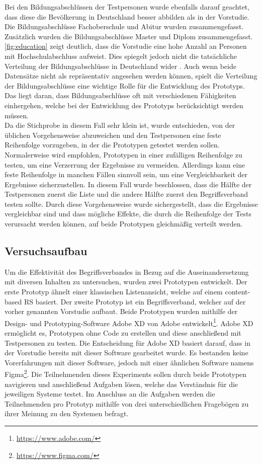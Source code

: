 Bei den Bildungsabschlüssen der Testpersonen wurde ebenfalls darauf geachtet, dass diese die Bevölkerung in Deutschland besser abbilden als in der Vorstudie.
Die Bildungsabschlüsse Fachoberschule und Abitur wurden zusammengefasst.
Zusätzlich wurden die Bildungsabschlüsse Master und Diplom zusammengefasst.
\autoref{fig:education} zeigt deutlich, dass die Vorstudie eine hohe Anzahl an Personen mit Hochschulabschluss aufweist.
Dies spiegelt jedoch nicht die tatsächliche Verteilung der Bildungsabschlüsse in Deutschland wider \cite{statistisches-bundesamt}.
Auch wenn beide Datensätze nicht als repräsentativ angesehen werden können, spielt die Verteilung der Bildungsabschlüsse eine wichtige Rolle für die Entwicklung des Prototyps.
Das liegt daran, dass Bildungsabschlüsse oft mit verschiedenen Fähigkeiten einhergehen, welche bei der Entwicklung des Prototyps berücksichtigt werden müssen.\\

Da die Stichprobe in diesem Fall sehr klein ist, wurde entschieden, von der üblichen Vorgehensweise abzuweichen und den Testpersonen eine feste Reihenfolge vorzugeben, in der die Prototypen getestet werden sollen.
Normalerweise wird empfohlen, Prototypen in einer zufälligen Reihenfolge zu testen, um eine Verzerrung der Ergebnisse zu vermeiden.
Allerdings kann eine feste Reihenfolge in manchen Fällen sinnvoll sein, um eine Vergleichbarkeit der Ergebnisse sicherzustellen.
In diesem Fall wurde beschlossen, dass die Hälfte der Testpersonen zuerst die Liste und die andere Hälfte zuerst den Begriffsverband testen sollte.
Durch diese Vorgehensweise wurde sichergestellt, dass die Ergebnisse vergleichbar sind und dass mögliche Effekte, die durch die Reihenfolge der Tests verursacht werden können, auf beide Prototypen gleichmäßig verteilt werden.

\subsection{Versuchsaufbau}
Um die Effektivität des Begriffsverbandes in Bezug auf die Auseinandersetzung mit diversen Inhalten zu untersuchen, wurden zwei Prototypen entwickelt.
Der erste Prototyp ähnelt einer klassischen Listenansicht, welche auf einem content-based \ac{RS} basiert.
Der zweite Prototyp ist ein Begriffsverband, welcher auf der vorher genannten Vorstudie aufbaut.
Beide Prototypen wurden mithilfe der Design- und Prototyping-Software Adobe XD von Adobe entwickelt\footnote{\url{https://www.adobe.com/}}.
Adobe XD ermöglicht es, Prototypen ohne Code zu erstellen und diese anschließend mit Testpersonen zu testen.
Die Entscheidung für Adobe XD basiert darauf, dass in der Vorstudie bereits mit dieser Software gearbeitet wurde.
Es bestanden keine Vorerfahrungen mit dieser Software, jedoch mit einer ähnlichen Software namens Figma\footnote{\url{https://www.figma.com/}}.
Die Teilnehmenden dieses Experiments sollen durch beide Prototypen navigieren und anschließend Aufgaben lösen, welche das Verständnis für die jeweiligen Systeme testet.
Im Anschluss an die Aufgaben werden die Teilnehmenden pro Prototyp mithilfe von drei unterschiedlichen Fragebögen zu ihrer Meinung zu den Systemen befragt.\\


